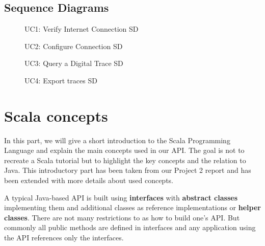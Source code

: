 \documentclass[
	a4paper,					10pt,							twoside,					openright,				notitlepage,			parskip=half,			]{scrreprt}
\begin{document}
\section{Sequence Diagrams}
\label{subsec:api_apistruct_sd}

\begin{figure}[H] 
\caption{UC1: Verify Internet Connection \gls{SD}}
\label{fig:sd-01-checkconnection}
\end{figure}

\begin{figure}[H] 
\caption{UC2: Configure Connection \gls{SD}}
\label{fig:sd-02-connectionsettings}
\end{figure}

\begin{figure}[H] 
\caption{UC3: Query a Digital Trace \gls{SD}}
\label{fig:sd-03-tracehandling}
\end{figure}

\begin{figure}[H] 
\caption{UC4: Export traces \gls{SD}}
\label{fig:sd-04-export}
\end{figure}


\clearpage{}
\clearpage{}

\chapter{Scala concepts}
\label{chap:scala}


In this part, we will give a short introduction to the Scala Programming Language and 
explain the main concepts used in our \gls{API}. The goal is not to recreate a Scala tutorial 
but to highlight the key concepts and the relation to Java. This introductory part has been
taken from our Project 2 report \cite{endetvanap:projecttwo} and has been extended with 
more details about used concepts.

A typical Java-based \gls{API} is built using \textbf{interfaces} with \textbf{abstract classes} implementing them 
and additional classes as reference implementations or \textbf{helper classes}. There are not many restrictions 
to as how to build one's \gls{API}. But commonly all public methods are defined in interfaces and any application using 
the \gls{API} references only the interfaces. 
\end{document}
